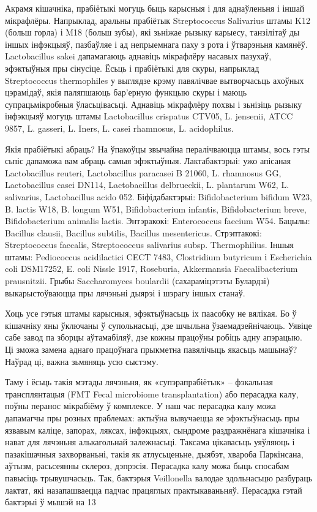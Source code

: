 Акрамя кішачніка, прабіётыкі могуць быць карысныя і для аднаўленьня і іншай мікрафлёры. Напрыклад, аральны прабіётык Streptococcus Salivarius штамы K12 (больш горла) і M18 (больш зубы), які зьніжае рызыку карыесу, танзілітаў ды іншых інфэкцыяў, пазбаўляе і ад непрыемнага паху з рота і ўтварэньня камянёў. Lactobacillus sakei дапамагаюць аднавіць мікрафлёру насавых пазухаў, эфэктыўныя пры сінусіце. Ёсьць і прабіётыкі для скуры, напрыклад Streptococcus thermophiles у выглядзе крэму павялічвае вытворчасьць ахоўных цэрамідаў, якія паляпшаюць бар'ерную функцыю скуры і маюць супрацьмікробныя ўласьцівасьці. Аднавіць мікрафлёру похвы і зьнізіць рызыку інфэкцыяў могуць штамы Lactobacillus crispatus CTV05, L. jensenii, ATCC 9857, L. gasseri, L. Iners, L. casei rhamnosus, L. acidophilus.

Якія прабіётыкі абраць? На ўпакоўцы звычайна пералічваюцца штамы, вось гэты сьпіс дапаможа вам абраць самыя эфэктыўныя. Лактабактэрыі: ужо апісаная Lactobacillus reuteri, Lactobacillus paracasei B 21060, L. rhamnosus GG, Lactobacillus casei DN114, Lactobacillus delbrueckii, L. plantarum W62, L. salivarius, Lactobacillus acido 052. Біфідабактэрыі: Bifidobacterium bifidum W23, B. lactis W18, B. longum W51, Bifidobacterium infantis, Bifidobacterium breve, Bifidobacterium animalis lactis. Энтэракокі: Enterococcus faecium W54. Бацылы: Bacillus clausii, Bacillus subtilis, Bacillus mesentericus. Стрэптакокі: Streptococcus faecalis, Streptococcus salivarius subsp. Thermophilius. Іншыя штамы: Pediococcus acidilactici CECT 7483, Clostridium butyricum і Escherichia coli DSM17252, E. coli Nissle 1917, Roseburia, Akkermansia Faecalibacterium prausnitzii. Грыбы Saccharomyces boulardii (сахараміцэтэты Булардзі) выкарыстоўваюцца пры лячэньні дыярэі і шэрагу іншых станаў.

Хоць усе гэтыя штамы карысныя, эфэктыўнасьць іх паасобку не вялікая. Бо ў кішачніку яны ўключаны ў супольнасьці, дзе шчыльна ўзаемадзейнічаюць. Уявіце сабе завод па зборцы аўтамабіляў, дзе кожны працоўны робіць адну апэрацыю. Ці зможа замена аднаго працоўнага прыкметна павялічыць якасьць машынаў? Наўрад ці, важна зьмяняць усю сыстэму.

Таму і ёсьць такія мэтады лячэньня, як «супэрапрабіётык» – фэкальная трансплянтацыя (FMT Fecal microbiome transplantation) або перасадка калу, поўны перанос мікрабіёму ў комплексе. У наш час перасадка калу можа дапамагчы пры розных праблемах: актыўна вывучаецца яе эфэктыўнасьць пры язвавым каліце, запорах, ляксах, інфэкцыях, сындроме раздражнёнага кішачніка і нават для лячэньня алькагольнай залежнасьці. Таксама цікавасьць уяўляюць і пазакішачныя захворваньні, такія як атлусьценьне, дыябэт, хвароба Паркінсана, аўтызм, расьсеянны склероз, дэпрэсія. Перасадка калу можа быць спосабам павысіць трывушчасьць. Так, бактэрыя Veillonella валодае здольнасьцю разбураць лактат, які назапашваецца падчас працяглых практыкаваньняў. Перасадка гэтай бактэрыі ў мышэй на 13%

